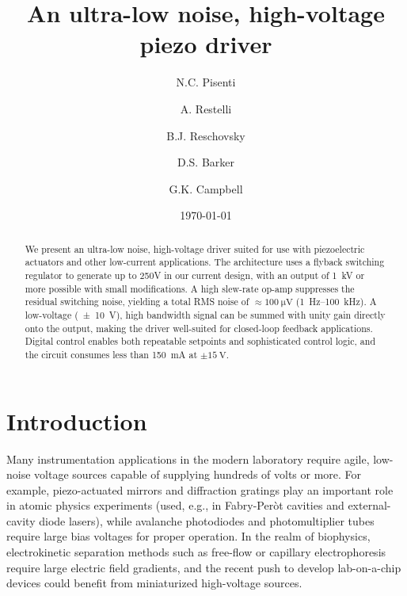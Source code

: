 \documentclass[aip,rsi,reprint]{revtex4-1} %
\begin{document}
\title{An ultra-low noise, high-voltage piezo driver}

\author{N.C. Pisenti}
\author{A. Restelli}
\author{B.J. Reschovsky}
\author{D.S. Barker}
\author{G.K. Campbell}

\date{\today}

\begin{abstract}
We present an ultra-low noise, high-voltage driver suited for use with piezoelectric actuators and other low-current applications. 
The architecture uses a flyback switching regulator to generate up to 250V in our current design, with an output of \SI{1}{\kilo\volt} or more possible with small modifications. 
A high slew-rate op-amp suppresses the residual switching noise, yielding a total RMS noise of $\approx\SI{100}{\micro\volt}$ (\SI{1}{\hertz}--\SI{100}{\kilo\hertz}).
A low-voltage (\SI{\pm 10}{\volt}), high bandwidth signal can be summed with unity gain directly onto the output, making the driver well-suited for closed-loop feedback applications.
Digital control enables both repeatable setpoints and sophisticated control logic, and the circuit consumes less than \SI{150}{\milli\ampere} at $\pm\SI{15}{\volt}$.
\end{abstract}

\pacs{}%

\maketitle %


\section{Introduction}
\label{Sec:Introduction}

Many instrumentation applications in the modern laboratory require agile, low-noise voltage sources capable of supplying hundreds of volts or more.
For example, piezo-actuated mirrors and diffraction gratings play an important role in atomic physics experiments (used, e.g., in Fabry-Per{\`o}t cavities\cite{Riedle1994a,Bohlouli-Zanjani2006a} and external-cavity diode lasers\cite{Wieman1991a}), while avalanche photodiodes and photomultiplier tubes require large bias voltages for proper operation.
In the realm of biophysics, electrokinetic separation methods such as free-flow or capillary electrophoresis\cite{Kohlheyer2008a} require large electric field gradients, and the recent push to develop lab-on-a-chip devices could benefit from miniaturized high-voltage sources.\cite{Temiz2015a}
\end{document}

